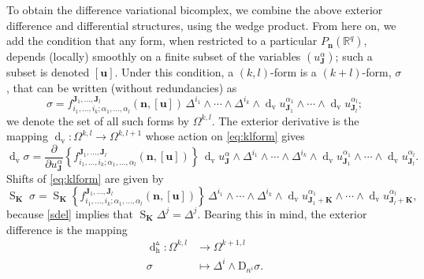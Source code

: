 \documentclass[11pt]{article} %
\numberwithin{equation}{section}
\newcommand{\es}{\operatorname{S}}
\newcommand{\upd}{\operatorname{d}}
\newcommand{\uph}{\operatorname{h}}
\newcommand{\upv}{\operatorname{v}}
\newcommand{\p}{\partial}
\newcommand{\dv}{\upd_{\upv}\!}
\newcommand{\diffi}{\mathrm{D}_{n^i}}
\newcommand{\mbn}{\mathbf{n}}
\newcommand{\mbu}{\mathbf{u}}
\newcommand{\mbJ}{\mathbf{J}}
\newcommand{\mbK}{\mathbf{K}}
\newcommand{\dDh}{\upd^{\vartriangle}_{\uph}}
\theoremstyle{plain}
\theoremstyle{definition}
\begin{document}
To obtain the difference variational bicomplex, we combine the above exterior difference and differential structures, using the wedge product. From here on, we add the condition that any form, when restricted to a particular $P_\mbn(\mathbb{R}^q)$, depends (locally) smoothly on a finite subset of the variables $(u^{\alpha}_{\mbJ})$; such a subset is denoted $[\mbu]$. Under this condition, a $(k,l)$-form is a $(k+l)$-form, $\sigma$, that can be written (without redundancies) as
\begin{equation}\label{eq:klform}
\sigma=f^{\mbJ_1,\ldots,\mbJ_l}_{i_1,\ldots,i_k;\alpha_1,\ldots,\alpha_l}(\mbn,[\mbu])\,
\Delta^{i_1}\wedge\cdots\wedge\Delta^{i_k}\wedge\dv 
u^{\alpha_1}_{\mbJ_1}\wedge\cdots\wedge\dv 
u^{\alpha_l}_{\mbJ_l};
\end{equation}
we denote the set of all such forms by $\Omega^{k,l}$. The exterior derivative is the mapping $\dv :\Omega^{k,l}\rightarrow\Omega^{k,l+1}$ whose action on \eqref{eq:klform} gives
\begin{equation}\label{eq:dvom}
\dv \sigma=\frac{\p}{\p u^\alpha_\mbJ}\left\{f^{\mbJ_1,\ldots,\mbJ_l}_{i_1,\ldots,i_k;\alpha_1,\ldots,\alpha_l}(\mbn,[\mbu])\right\}\,
\dv u^\alpha_\mbJ\wedge\Delta^{i_1}\wedge\cdots\wedge\Delta^{i_k}\wedge\dv 
u^{\alpha_1}_{\mbJ_1}\wedge\cdots\wedge\dv 
u^{\alpha_l}_{\mbJ_l}.
\end{equation}
Shifts of \eqref{eq:klform} are given by
\begin{equation}\label{eq:siom}
\es_\mbK\;\!\!\sigma=\es_\mbK\left\{f^{\mbJ_1,\ldots,\mbJ_l}_{i_1,\ldots,i_k;\alpha_1,\ldots,\alpha_l}(\mbn,[\mbu])\right\}\,
\Delta^{i_1}\wedge\cdots\wedge\Delta^{i_k}\wedge\dv 
u^{\alpha_1}_{\mbJ_1+\mbK}\wedge\cdots\wedge\dv 
u^{\alpha_l}_{\mbJ_l+\mbK},
\end{equation}
because \eqref{sdel} implies that $\es_\mbK\!\Delta^j=\Delta^j$. 
Bearing this in mind, the exterior difference is the mapping
\begin{equation}\label{exdiff}
\begin{aligned}
\dDh:\Omega^{k,l}&\rightarrow\Omega^{k+1,l}\\
\sigma&\mapsto \Delta^i\wedge \diffi\sigma.  \end{aligned}
\end{equation}
\end{document}
